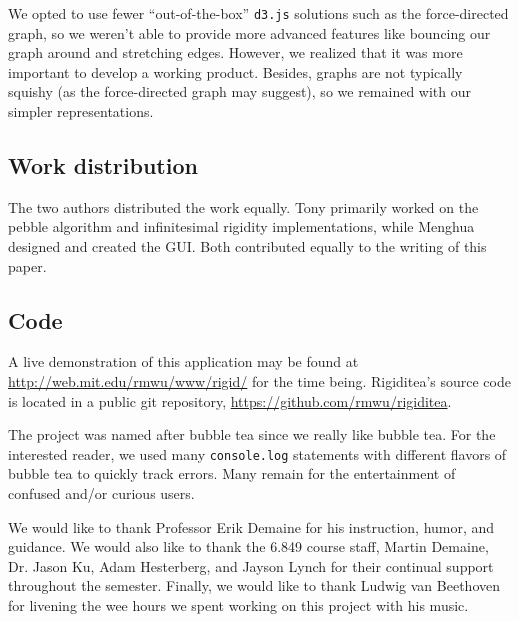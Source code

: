 \documentclass[aps,prd,final,twocolumn,letterpaper,nofootinbib]{revtex4-1}
\begin{document}
We opted to use fewer ``out-of-the-box'' \texttt{d3.js} solutions such as
the force-directed graph, so we weren't able to provide more advanced features
like bouncing our graph around and stretching edges.
However, we realized that it was more important to develop a working product.
Besides, graphs are not typically squishy (as the force-directed graph may suggest),
so we remained with our simpler representations.

\subsection{Work distribution}

The two authors distributed the work equally.
Tony primarily worked on the pebble algorithm and infinitesimal rigidity implementations,
while Menghua designed and created the GUI.
Both contributed equally to the writing of this paper.

\subsection{Code}

A live demonstration of this application may be found at
\url{http://web.mit.edu/rmwu/www/rigid/} for the time being.
Rigiditea's source code is located in a public git repository,
\url{https://github.com/rmwu/rigiditea}.

The project was named after bubble tea since we really like bubble tea.
For the interested reader, we used many \texttt{console.log} statements
with different flavors of bubble tea to quickly track errors.
Many remain for the entertainment of confused and/or curious users.

\begin{acknowledgments}
We would like to thank Professor Erik Demaine for his instruction,
humor, and guidance. We would also like to thank the 6.849 course staff,
Martin Demaine, Dr. Jason Ku, Adam Hesterberg, and Jayson Lynch
for their continual support throughout the semester.
Finally, we would like to thank Ludwig van Beethoven for livening
the wee hours we spent working on this project with his music.
\end{acknowledgments}

{}

\end{document}
